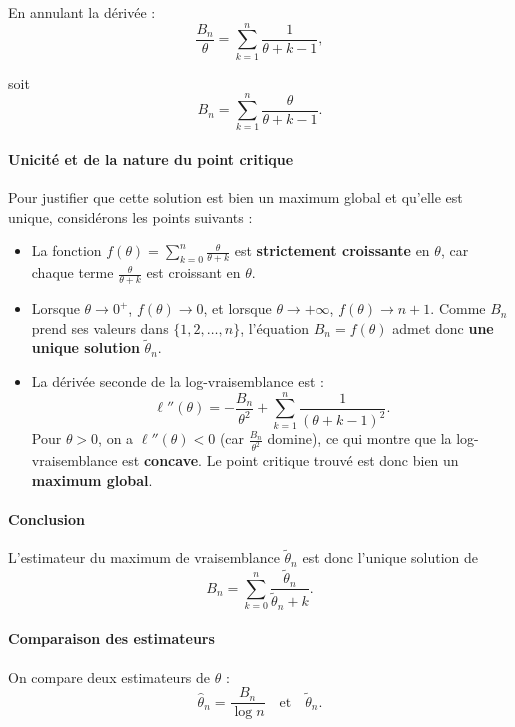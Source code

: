 \documentclass[12pt, a4paper]{article}
\theoremstyle{definition}
\theoremstyle{plain}
\begin{document}
En annulant la dérivée :
\[
\frac{B_n}{\theta}
= \sum_{k=1}^{n} \frac{1}{\theta + k - 1},
\]

soit
\[
B_n = \sum_{k=1}^{n} \frac{\theta}{\theta + k - 1}.
\]


\paragraph{Unicité et de la nature du point critique}

Pour justifier que cette solution est bien un maximum global et qu'elle est unique, considérons les points suivants :

\begin{itemize}
    \item La fonction \( f(\theta) = \sum_{k=0}^{n} \frac{\theta}{\theta + k} \) est \textbf{strictement croissante} en \(\theta\), car chaque terme \(\frac{\theta}{\theta + k}\) est croissant en \(\theta\).
    \item Lorsque \(\theta \to 0^+\), \(f(\theta) \to 0\), et lorsque \(\theta \to +\infty\), \(f(\theta) \to n+1\). Comme \(B_n\) prend ses valeurs dans \(\{1, 2, \dots, n\}\), l'équation \(B_n = f(\theta)\) admet donc \textbf{une unique solution} \(\tilde{\theta}_n\).
    \item La dérivée seconde de la log-vraisemblance est :
    \[
    \ell''(\theta) = -\frac{B_n}{\theta^2} + \sum_{k=1}^{n} \frac{1}{(\theta + k - 1)^2}.
    \]
    Pour \(\theta > 0\), on a \(\ell''(\theta) < 0\) (car \(\frac{B_n}{\theta^2}\) domine), ce qui montre que la log-vraisemblance est \textbf{concave}. Le point critique trouvé est donc bien un \textbf{maximum global}.
\end{itemize}

\paragraph{Conclusion}

L’estimateur du maximum de vraisemblance $\tilde{\theta}_n$ est donc l’unique solution de
\[
B_n = \sum_{k=0}^{n} \frac{\tilde{\theta}_n}{\tilde{\theta}_n + k}.
\]


\paragraph{Comparaison des estimateurs}

On compare deux estimateurs de $\theta$ :
\[
\hat{\theta}_n = \frac{B_n}{\log n}
\quad \text{et} \quad
\tilde{\theta}_n^{\mathrm{}}.
\]
\end{document}
